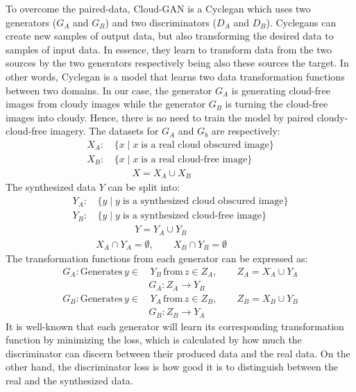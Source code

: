 \documentclass[../main.tex]{subfiles}
\begin{document}
To overcome the paired-data, Cloud-GAN \cite{cloud-gan} is a Cycle\gls{gan} \cite{CycleGAN2017} which uses two generators ($G_A$ and $G_B$) and two discriminators ($D_A$ and $D_B$). Cycle\gls{gan}s can create new samples of output data, but also transforming the desired data to samples of input data. In essence, they learn to transform data from the two sources by the two generators respectively being also these sources the target. In other words, Cycle\gls{gan} is a model that learns two data transformation functions between two domains. In our case, the generator $G_A$ is generating cloud-free images from cloudy images while the generator $G_B$ is turning the cloud-free images into cloudy. Hence, there is no need to train the model by paired cloudy-cloud-free imagery. The datasets for $G_A$ and $G_b$ are respectively:
\begin{align*}
	X_A:& \, \{ x \mid x \; \text{is a real cloud obscured image}\}\\
	X_B:& \, \{ x \mid x \; \text{is a real cloud-free image}\}\\
	& \qquad X = X_A \cup X_B
\end{align*}
The synthesized data $Y$ can be split into:
\begin{align*}
	Y_A:& \, \{y \mid y \; \text{is a synthesized cloud obscured image}\}\\
	Y_B:& \, \{y \mid y \; \text{is a synthesized cloud-free image}\}\\
	& \qquad \qquad Y = Y_A \cup Y_B\\
	& 		X_A \cap Y_A = \emptyset, \qquad  X_B \cap Y_B = \emptyset 
\end{align*}
The transformation functions from each generator can be expressed as:
\begin{align*}
	G_A: \text{Generates} \, y \in& \, Y_B \, \text{from} \, z \in Z_A, \qquad Z_A = X_A \cup Y_A\\
	&G_A : Z_A \longrightarrow Y_B\\
	G_B: \text{Generates} \, y \in& \, Y_A \, \text{from} \, z \in Z_B, \qquad Z_B = X_B \cup Y_B\\
	&G_B : Z_B \longrightarrow Y_A
\end{align*}
It is well-known that each generator will learn its corresponding transformation function by minimizing the loss, which is calculated by how much the discriminator can discern between their produced data and the real data. On the other hand, the discriminator loss is how good it is to distinguish between the real and the synthesized data.
\\
\end{document}
